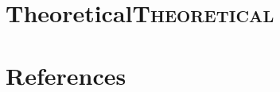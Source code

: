 \documentclass[11pt]{article}
\begin{document}
\section{Theoretical\hfill{}\textsc{Theoretical}}
\label{sec:org74af71f}
\section*{References}
\label{sec:org6584ca1}
\printbibliography[heading=none]
\end{document}
